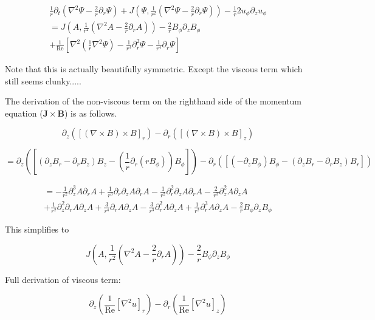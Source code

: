 \documentclass{paper}
\newcommand{\beq}{\begin{equation}}
\newcommand{\eeq}{\end{equation}}
\newcommand\reye{\mathrm{Re}}
\begin{document}
\begin{multline}
\frac{1}{r}\partial_t \left(\nabla^2 \Psi - \frac{2}{r} \partial_r \Psi \right) + J\left(\Psi, \frac{1}{r^2} \left( \nabla^2 \Psi - \frac{2}{r} \partial_r\Psi\right) \right) - \frac{1}{r} 2 u_\phi \partial_z u_\phi \\
= J\left(A, \frac{1}{r^2} \left( \nabla^2 A - \frac{2}{r} \partial_rA\right) \right) - \frac{2}{r}B_\phi \partial_z B_\phi \\
+ \frac{1}{\reye} \left[ \nabla^2 \left(\frac{1}{r} \nabla^2 \Psi\right) - \frac{1}{r^3} \partial_r^2 \Psi - \frac{1}{r^4}\partial_r\Psi\right]
\end{multline}

Note that this is actually beautifully symmetric. Except the viscous term which still seems clunky.....

The derivation of the non-viscous term on the righthand side of the momentum equation ($\mathbf{J} \times \mathbf{B}$) is as follows. 

\beq
\partial_z\left(\left[\left(\nabla \times B \right) \times B \right]_r\right) - \partial_r \left(\left[\left(\nabla \times B\right) \times B \right]_z\right)
\eeq

\beq
= \partial_z\left(\left[\left(\partial_z B_r - \partial_r B_z \right) B_z - \left(\frac{1}{r}\partial_r\left(r B_\phi\right)\right) B_\phi \right] \right) - \partial_r \left(\left[\left(-\partial_z B_\phi\right)B_\phi - \left(\partial_z B_r - \partial_r B_z \right) B_r\right]\right)
\eeq

\begin{multline}
= -\frac{1}{r^2} \partial_z^3 A \partial_r A + \frac{1}{r^3} \partial_r \partial_z A \partial_r A - \frac{1}{r^2} \partial_r^2 \partial_z A \partial_r A - \frac{2}{r^3} \partial_z^2 A \partial_z A \\
+ \frac{1}{r^2} \partial_z^2 \partial_r A \partial_z A + \frac{3}{r^4} \partial_r A \partial_z A - \frac{3}{r^3} \partial_r^2 A \partial_z A + \frac{1}{r^2} \partial_r^3 A \partial_z A - \frac{2}{r} B_\phi \partial_z B_\phi
\end{multline}

This simplifies to 

\beq
J\left(A, \frac{1}{r^2} \left( \nabla^2 A - \frac{2}{r} \partial_rA\right) \right) - \frac{2}{r}B_\phi \partial_z B_\phi
\eeq

Full derivation of viscous term:

\beq
\partial_z \left(\frac{1}{\reye}\left[\nabla^2 u\right]_r\right) - \partial_r \left(\frac{1}{\reye}\left[\nabla^2 u\right]_z\right)
\eeq
\end{document}
